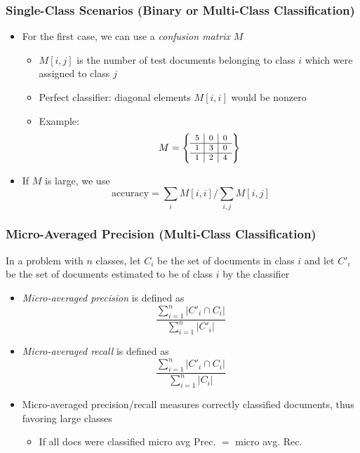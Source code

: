 \documentclass{beamer}
\begin{document}
\begin{frame} \frametitle{Single-Class Scenarios (Binary or Multi-Class Classification)}
  \begin{itemize}
  \item For the first case, we can use a \emph{confusion matrix} $M$
    \begin{itemize}
    \item $M[i,j]$ is the number of test documents belonging to class $i$ which
      were assigned to class $j$
    \item Perfect classifier: diagonal elements $M[i,i]$ would be nonzero
    \item Example:
      \begin{displaymath}
        \footnotesize
        M = \left\{
          \begin{array}{c|c|c}
            5 & 0 & 0 \\\hline
            1 & 3 & 0 \\\hline
            1 & 2 & 4
          \end{array}
        \right\}
      \end{displaymath}
    \end{itemize}
  \item If $M$ is large, we use
    \begin{displaymath}
      \text{accuracy} = \sum_i M[i,i] / \sum_{i,j} M[i,j]
    \end{displaymath}
  \end{itemize}
\end{frame}


\begin{frame} \frametitle{Micro-Averaged Precision (Multi-Class Classification)}
  
  In a problem with $n$ classes, let $C_i$ be the set of documents in class
  $i$ and let $C'_i$ be the set of documents estimated to be of class $i$ by
  the classifier
  \begin{itemize}
  \item \emph{Micro-averaged precision} is defined as
    \begin{displaymath}
      \frac{\sum_{i=1}^n |C'_i \cap C_i|}{\sum_{i=1}^n |C'_i|}
    \end{displaymath}
  \item \emph{Micro-averaged recall} is defined as
    \begin{displaymath}
      \frac{\sum_{i=1}^n |C'_i \cap C_i|}{\sum_{i=1}^n |C_i|}
    \end{displaymath}
  \end{itemize}
  \begin{itemize}
  \item Micro-averaged precision/recall measures correctly classified
    documents, thus favoring large classes
    \begin{itemize}
    \item If all docs were classified micro avg Prec. $=$ micro
        avg. Rec.
  \end{itemize}
  \end{itemize}
\end{frame}
\end{document}
